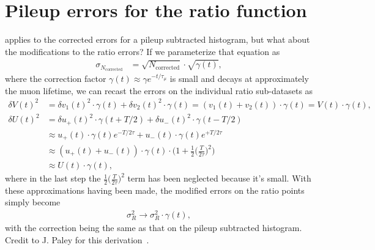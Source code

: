\section{Pileup errors for the ratio function}

 applies to the corrected errors for a pileup subtracted histogram, but what about the modifications to the ratio errors? If we parameterize that equation as 
 	\begin{align}
 		\sigma_{N_{\text{corrected}}} &= \sqrt{N_{\text{corrected}}} \cdot \sqrt{\gamma(t)},
	\end{align}
where the correction factor $\gamma(t) \approx \gamma e^{-t/\tau_{\mu}}$ is small and decays at approximately the muon lifetime, we can recast the errors on the individual ratio sub-datasets as
	\begin{equation}	
	\begin{aligned}
  		\delta V(t)^{2} &= \delta v_{1}(t)^{2}\cdot \gamma(t) + \delta v_{2}(t)^{2} \cdot \gamma(t) = (v_{1}(t) + v_{2}(t)) \cdot \gamma(t) = V(t) \cdot \gamma(t), \\
   		\delta U(t)^{2} &= \delta u_{+}(t)^{2}\cdot \gamma(t+T/2) + \delta u_{-}(t)^{2} \cdot \gamma(t-T/2) \\
   						&\approx u_{+}(t) \cdot \gamma(t)e^{-T/2\tau} + u_{-}(t) \cdot \gamma(t)e^{+T/2\tau} \\
   						&\approx (u_{+}(t) + u_{-}(t)) \cdot \gamma(t) \cdot \Big(1 + \frac{1}{2}\Big(\frac{T}{2\tau}\Big)^{2}\Big) \\
   						&\approx  U(t) \cdot \gamma(t),
	\end{aligned}
	\end{equation}
where in the last step the $\frac{1}{2}\Big(\frac{T}{2\tau}\Big)^{2}$ term has been neglected because it's small. With these approximations having been made, the modified errors on the ratio points simply become
 	\begin{align}
 		\sigma_{R}^{2} \rightarrow \sigma_{R}^{2} \cdot \gamma(t), 
	\end{align}
with the correction being the same as that on the pileup subtracted histogram. Credit to J. Paley for this derivation~\cite{JPThesis}.

